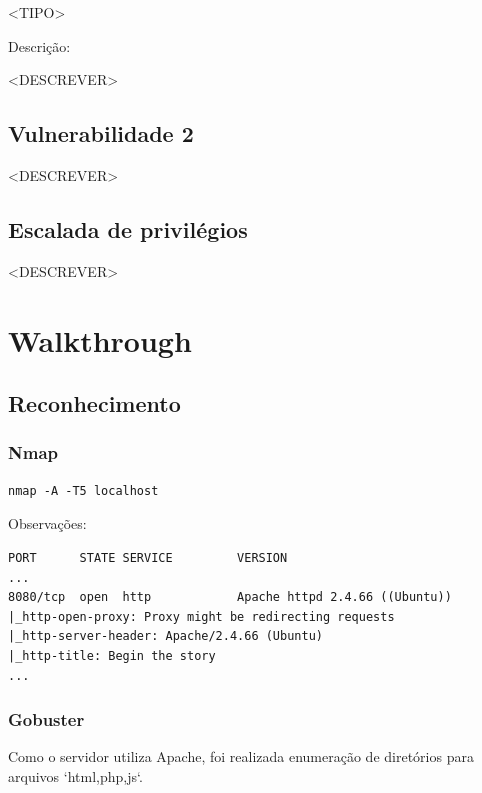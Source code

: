 <TIPO>

Descrição:

<DESCREVER>

\vspace{1em}

\subsection{Vulnerabilidade 2}

<DESCREVER>

\vspace{1em}

\subsection{Escalada de privilégios}

<DESCREVER>


\section{Walkthrough}


\subsection{Reconhecimento}

\subsubsection{Nmap}
\begin{lstlisting}[style=command]
nmap -A -T5 localhost
\end{lstlisting}

Observações:

\begin{lstlisting}[style=output]
PORT      STATE SERVICE         VERSION
...
8080/tcp  open  http            Apache httpd 2.4.66 ((Ubuntu))
|_http-open-proxy: Proxy might be redirecting requests
|_http-server-header: Apache/2.4.66 (Ubuntu)
|_http-title: Begin the story
...
\end{lstlisting}

\subsubsection{Gobuster}
Como o servidor utiliza Apache, foi realizada enumeração de diretórios para arquivos `html,php,js`.

